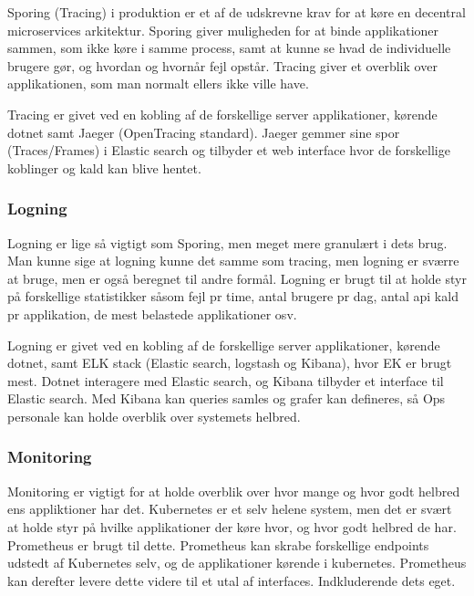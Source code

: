Sporing (Tracing) i produktion er et af de udskrevne krav for at køre en decentral microservices arkitektur. Sporing giver muligheden for at binde applikationer sammen, som ikke køre i samme process, samt at kunne se hvad de individuelle brugere gør, og hvordan og hvornår fejl opstår. Tracing giver et overblik over applikationen, som man normalt ellers ikke ville have.

Tracing er givet ved en kobling af de forskellige server applikationer, kørende dotnet samt Jaeger (OpenTracing standard). Jaeger gemmer sine spor (Traces/Frames) i Elastic search og tilbyder et web interface hvor de forskellige koblinger og kald kan blive hentet.


\subsubsection{Logning}

Logning er lige så vigtigt som Sporing, men meget mere granulært i dets brug. Man kunne sige at logning kunne det samme som tracing, men logning er sværre at bruge, men er også beregnet til andre formål. Logning er brugt til at holde styr på forskellige statistikker såsom fejl pr time, antal brugere pr dag, antal api kald pr applikation, de mest belastede applikationer osv. 

Logning er givet ved en kobling af de forskellige server applikationer, kørende dotnet, samt ELK stack (Elastic search, logstash og Kibana), hvor EK er brugt mest. Dotnet interagere med Elastic search, og Kibana tilbyder et interface til Elastic search. Med Kibana kan queries samles og grafer kan defineres, så Ops personale kan holde overblik over systemets helbred.


\subsubsection{Monitoring}

Monitoring er vigtigt for at holde overblik over hvor mange og hvor godt helbred ens appliktioner har det. Kubernetes er et selv helene system, men det er svært at holde styr på hvilke applikationer der køre hvor, og hvor godt helbred de har. Prometheus er brugt til dette. Prometheus kan skrabe forskellige endpoints udstedt af Kubernetes selv, og de applikationer kørende i kubernetes. Prometheus kan derefter levere dette videre til et utal af interfaces. Indkluderende dets eget.

